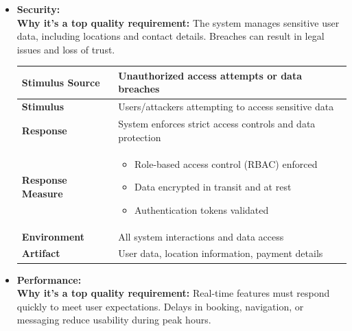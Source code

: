 \documentclass[12pt]{article}
\begin{document}
\begin{itemize}
  \item \textbf{Security:} \\
  \textbf{Why it's a top quality requirement:} The system manages sensitive user data, including locations and contact details. Breaches can result in legal issues and loss of trust. \\

  \begin{table}[H]
\centering
\begin{tabular}{|l|p{10cm}|}
\hline
\textbf{Stimulus Source} & Unauthorized access attempts or data breaches \\
\hline
\textbf{Stimulus} & Users/attackers attempting to access sensitive data \\
\hline
\textbf{Response} & System enforces strict access controls and data protection \\
\hline
\textbf{Response Measure} & 
\begin{itemize}
  \item Role-based access control (RBAC) enforced
  \item Data encrypted in transit and at rest
  \item Authentication tokens validated
\end{itemize} \\
\hline
\textbf{Environment} & All system interactions and data access \\
\hline
\textbf{Artifact} & User data, location information, payment details \\
\hline
\end{tabular}
\end{table}

  \item \textbf{Performance:} \\
  \textbf{Why it's a top quality requirement:} Real-time features must respond quickly to meet user expectations. Delays in booking, navigation, or messaging reduce usability during peak hours. \\


\end{itemize}
\end{document}
